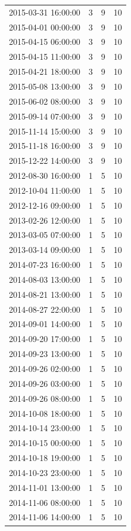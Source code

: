 \begin{tabular}{lrrr}
2015-03-31 16:00:00 & 3 & 9 & 10 \\
2015-04-01 00:00:00 & 3 & 9 & 10 \\
2015-04-15 06:00:00 & 3 & 9 & 10 \\
2015-04-15 11:00:00 & 3 & 9 & 10 \\
2015-04-21 18:00:00 & 3 & 9 & 10 \\
2015-05-08 13:00:00 & 3 & 9 & 10 \\
2015-06-02 08:00:00 & 3 & 9 & 10 \\
2015-09-14 07:00:00 & 3 & 9 & 10 \\
2015-11-14 15:00:00 & 3 & 9 & 10 \\
2015-11-18 16:00:00 & 3 & 9 & 10 \\
2015-12-22 14:00:00 & 3 & 9 & 10 \\
2012-08-30 16:00:00 & 1 & 5 & 10 \\
2012-10-04 11:00:00 & 1 & 5 & 10 \\
2012-12-16 09:00:00 & 1 & 5 & 10 \\
2013-02-26 12:00:00 & 1 & 5 & 10 \\
2013-03-05 07:00:00 & 1 & 5 & 10 \\
2013-03-14 09:00:00 & 1 & 5 & 10 \\
2014-07-23 16:00:00 & 1 & 5 & 10 \\
2014-08-03 13:00:00 & 1 & 5 & 10 \\
2014-08-21 13:00:00 & 1 & 5 & 10 \\
2014-08-27 22:00:00 & 1 & 5 & 10 \\
2014-09-01 14:00:00 & 1 & 5 & 10 \\
2014-09-20 17:00:00 & 1 & 5 & 10 \\
2014-09-23 13:00:00 & 1 & 5 & 10 \\
2014-09-26 02:00:00 & 1 & 5 & 10 \\
2014-09-26 03:00:00 & 1 & 5 & 10 \\
2014-09-26 08:00:00 & 1 & 5 & 10 \\
2014-10-08 18:00:00 & 1 & 5 & 10 \\
2014-10-14 23:00:00 & 1 & 5 & 10 \\
2014-10-15 00:00:00 & 1 & 5 & 10 \\
2014-10-18 19:00:00 & 1 & 5 & 10 \\
2014-10-23 23:00:00 & 1 & 5 & 10 \\
2014-11-01 13:00:00 & 1 & 5 & 10 \\
2014-11-06 08:00:00 & 1 & 5 & 10 \\
2014-11-06 14:00:00 & 1 & 5 & 10 \\

\end{tabular}
